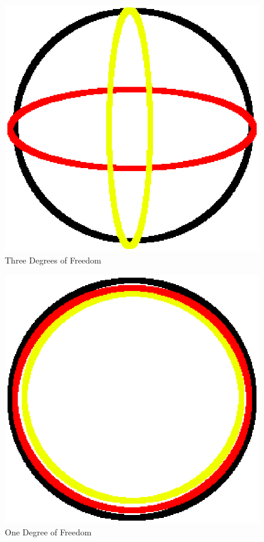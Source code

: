\documentclass[12pt]{report}
\begin{document}
\begin{figure}[3dof]
\includegraphics{3dof}
\caption {Three Degrees of Freedom}
\end{figure}
\begin{figure}[1dof]
\includegraphics{1dof}
\caption {One Degree of Freedom}
\end{figure}
\end{document}
